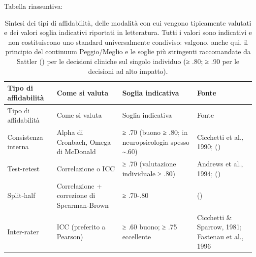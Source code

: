 \documentclass[
  italian,
  letterpaper,
  paper=6in:9in,
  pagesize=pdftex,
  headinclude=on,
  footinclude=on,
  11pt]{scrbook}
\begin{document}
Tabella riassuntiva:

\begin{longtable}[]{@{}
  >{\raggedright\arraybackslash}p{}
  >{\raggedright\arraybackslash}p{}
  >{\raggedright\arraybackslash}p{}
  >{\raggedright\arraybackslash}p{}@{}}
\caption{Sintesi dei tipi di affidabilità, delle modalità con cui
vengono tipicamente valutati e dei valori soglia indicativi riportati in
letteratura. Tutti i valori sono indicativi e non costituiscono uno
standard universalmente condiviso: valgono, anche qui, il principio del
continuum Peggio/Meglio e le soglie più stringenti raccomandate da
Sattler (\citeyear{sattler2001assessment}) per le decisioni cliniche sul
singolo individuo (≥ .80; ≥ .90 per le decisioni ad alto
impatto).}\label{tbl-affidabilita}\tabularnewline
\toprule\noalign{}
\begin{minipage}[b]{\linewidth}\raggedright
Tipo di affidabilità
\end{minipage} & \begin{minipage}[b]{\linewidth}\raggedright
Come si valuta
\end{minipage} & \begin{minipage}[b]{\linewidth}\raggedright
Soglia indicativa
\end{minipage} & \begin{minipage}[b]{\linewidth}\raggedright
Fonte
\end{minipage} \\
\midrule\noalign{}
\endfirsthead
\toprule\noalign{}
\begin{minipage}[b]{\linewidth}\raggedright
Tipo di affidabilità
\end{minipage} & \begin{minipage}[b]{\linewidth}\raggedright
Come si valuta
\end{minipage} & \begin{minipage}[b]{\linewidth}\raggedright
Soglia indicativa
\end{minipage} & \begin{minipage}[b]{\linewidth}\raggedright
Fonte
\end{minipage} \\
\midrule\noalign{}
\endhead
\bottomrule\noalign{}
\endlastfoot
Consistenza interna & Alpha di Cronbach, Omega di McDonald & ≥ .70
(buono ≥ .80; in neuropsicologia spesso \textasciitilde.60) & Cicchetti
et al., 1990; (\cite{sattler2001assessment}) \\
Test-retest & Correlazione o ICC & ≥ .70 (valutazione individuale ≥ .80)
& Andrews et al., 1994; (\cite{sattler2001assessment}) \\
Split-half & Correlazione + correzione di Spearman-Brown & ≥ .70-.80 &
(\cite{slick2006psychometrics}) \\
Inter-rater & ICC (preferito a Pearson) & ≥ .60 buono; ≥ .75 eccellente
& Cicchetti \& Sparrow, 1981; Fastenau et al., 1996 \\
\end{longtable}
\end{document}
